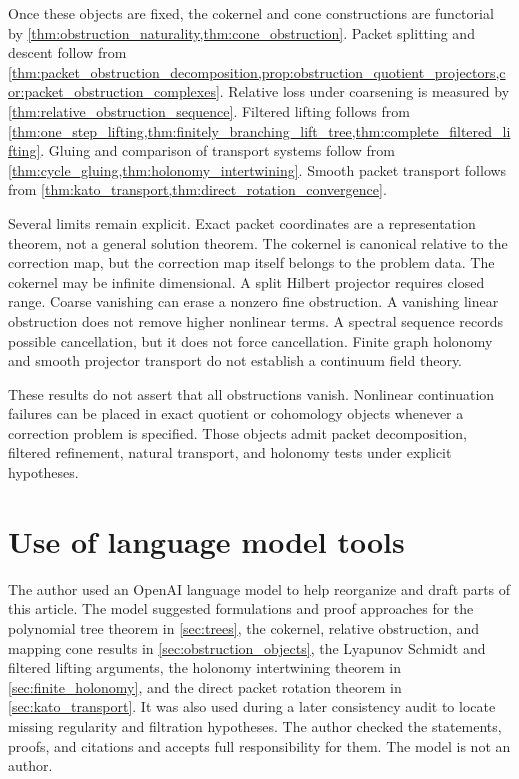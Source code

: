 \documentclass[11pt,a4paper]{article}
\theoremstyle{plain}
\theoremstyle{definition}
\theoremstyle{remark}
\begin{document}
Once these objects are fixed, the cokernel and cone constructions are functorial by \cref{thm:obstruction_naturality,thm:cone_obstruction}.  Packet splitting and descent follow from \cref{thm:packet_obstruction_decomposition,prop:obstruction_quotient_projectors,cor:packet_obstruction_complexes}.  Relative loss under coarsening is measured by \cref{thm:relative_obstruction_sequence}.  Filtered lifting follows from \cref{thm:one_step_lifting,thm:finitely_branching_lift_tree,thm:complete_filtered_lifting}.  Gluing and comparison of transport systems follow from \cref{thm:cycle_gluing,thm:holonomy_intertwining}.  Smooth packet transport follows from \cref{thm:kato_transport,thm:direct_rotation_convergence}.

Several limits remain explicit.  Exact packet coordinates are a representation theorem, not a general solution theorem.  The cokernel is canonical relative to the correction map, but the correction map itself belongs to the problem data.  The cokernel may be infinite dimensional.  A split Hilbert projector requires closed range.  Coarse vanishing can erase a nonzero fine obstruction.  A vanishing linear obstruction does not remove higher nonlinear terms.  A spectral sequence records possible cancellation, but it does not force cancellation.  Finite graph holonomy and smooth projector transport do not establish a continuum field theory.

These results do not assert that all obstructions vanish.  Nonlinear continuation failures can be placed in exact quotient or cohomology objects whenever a correction problem is specified.  Those objects admit packet decomposition, filtered refinement, natural transport, and holonomy tests under explicit hypotheses.

\section*{Use of language model tools}

The author used an OpenAI language model to help reorganize and draft parts of this article.  The model suggested formulations and proof approaches for the polynomial tree theorem in \cref{sec:trees}, the cokernel, relative obstruction, and mapping cone results in \cref{sec:obstruction_objects}, the Lyapunov Schmidt and filtered lifting arguments, the holonomy intertwining theorem in \cref{sec:finite_holonomy}, and the direct packet rotation theorem in \cref{sec:kato_transport}.  It was also used during a later consistency audit to locate missing regularity and filtration hypotheses.  The author checked the statements, proofs, and citations and accepts full responsibility for them.  The model is not an author.


\begingroup\small{}


\endgroup
\end{document}
